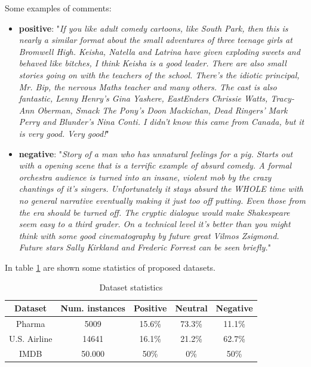 Some examples of comments:
\begin{itemize}
	\item \textbf{positive}: "\textit{If you like adult comedy cartoons, like South Park, then this is nearly a similar format about the small adventures of three teenage girls at Bromwell High. Keisha, Natella and Latrina have given exploding sweets and behaved like bitches, I think Keisha is a good leader. There are also small stories going on with the teachers of the school. There's the idiotic principal, Mr. Bip, the nervous Maths teacher and many others. The cast is also fantastic, Lenny Henry's Gina Yashere, EastEnders Chrissie Watts, Tracy-Ann Oberman, Smack The Pony's Doon Mackichan, Dead Ringers' Mark Perry and Blunder's Nina Conti. I didn't know this came from Canada, but it is very good. Very good!}"
	\item \textbf{negative}: "\textit{Story of a man who has unnatural feelings for a pig. Starts out with a opening scene that is a terrific example of absurd comedy. A formal orchestra audience is turned into an insane, violent mob by the crazy chantings of it's singers. Unfortunately it stays absurd the WHOLE time with no general narrative eventually making it just too off putting. Even those from the era should be turned off. The cryptic dialogue would make Shakespeare seem easy to a third grader. On a technical level it's better than you might think with some good cinematography by future great Vilmos Zsigmond. Future stars Sally Kirkland and Frederic Forrest can be seen briefly.}"
\end{itemize}



\vspace{1cm}
In table \ref{table:dataset_statistics} are shown some statistics of proposed datasets.


\begin{table}[ht]
	\centering    
	\begin{tabular}{ | c | c | c | c | c | }
		\hline
		Dataset & Num. instances & Positive & Neutral & Negative\\ 
		\hline
		Pharma & 5009 & 15.6\% & 73.3\% & 11.1\% \\
		U.S. Airline & 14641 & 16.1\% & 21.2\% & 62.7\% \\
		IMDB & 50.000 & 50\% & 0\% & 50\% \\
		\hline
	\end{tabular}
	\captionsetup{justification=centering}
	\caption{Dataset statistics}
	\label{table:dataset_statistics}
\end{table}

